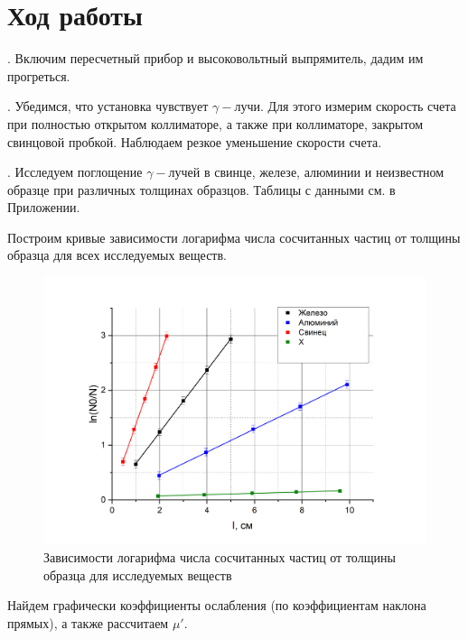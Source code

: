 \documentclass[a4paper,12pt]{article} %
\begin{document}
\newpage

\section{Ход работы}

. Включим пересчетный прибор и высоковольтный выпрямитель, дадим им прогреться.

\medskip

. Убедимся, что установка чувствует $\gamma-$лучи. Для этого измерим скорость счета при полностью открытом коллиматоре, а также при коллиматоре, закрытом свинцовой пробкой. Наблюдаем резкое уменьшение скорости счета.

\medskip

. Исследуем поглощение $\gamma-$лучей в свинце, железе, алюминии и неизвестном образце при различных толщинах образцов. Таблицы с данными см. в Приложении.

\medskip

\noindent Построим кривые зависимости логарифма числа сосчитанных частиц от толщины образца для всех исследуемых веществ.

\medskip

\begin{figure}[h!]
		\centering
		\includegraphics[width=0.99\linewidth]{graph.png}
		\caption{Зависимости логарифма числа сосчитанных частиц от толщины образца для исследуемых веществ}
		
	\end{figure}

\medskip

\noindent Найдем графически коэффициенты ослабления (по коэффициентам наклона прямых), а также рассчитаем $\mu'$.
\end{document}
